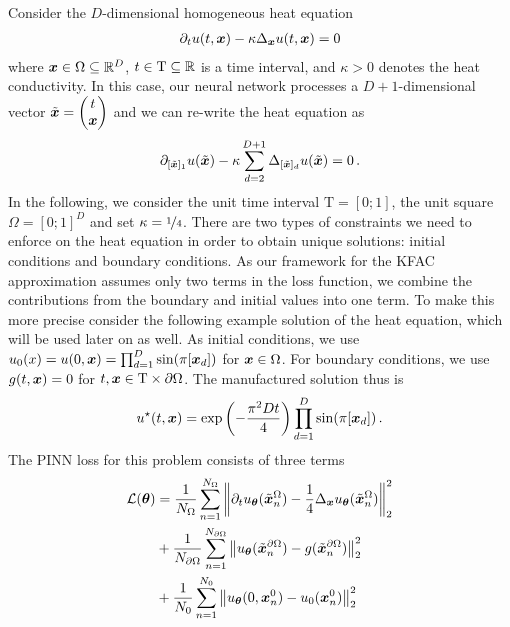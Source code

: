 Consider the $D$-dimensional homogeneous heat equation
\begin{align*}
  \partial_{t} u(t, {\bm{x}})
  -
  \kappa \Delta_{{\bm{x}}} u(t, {\bm{x}})
  =
  0
\end{align*}
where ${\bm{x}} \in \Omega \subseteq {\mathbb{R}}^D$, $t \in \mathrm{T} \subseteq {\mathbb{R}}$ is a time interval, and $\kappa >0$ denotes the heat conductivity. In this case, our neural network processes a $D+1$-dimensional vector $\tilde{{\bm{x}}} =
\begin{pmatrix} t \\ {\bm{x}} \end{pmatrix}$ and we can re-write the heat equation as
\begin{align*}
  \partial_{[\tilde{{\bm{x}}}]_1} u(\tilde{{\bm{x}}})
  -
  \kappa \sum_{d=2}^{D+1} \Delta_{[\tilde{{\bm{x}}}]_d} u(\tilde{{\bm{x}}})
  =
  0\,.
\end{align*}
In the following, we consider the unit time interval $\mathrm{T} = [0;1]$, the unit square $\Omega = [0;1]^D$ and set $\kappa = \nicefrac{1}{4}$. There are two types of constraints we need to enforce on the heat equation in order to obtain unique solutions: initial conditions and boundary conditions. As our framework for the KFAC approximation assumes only two terms in the loss function, we combine the contributions from the boundary and initial values into one term. To make this more precise consider the following example solution of the heat equation, which will be used later on as well.
As initial conditions, we use $u_0(x) = u(0, {\bm{x}}) = \prod_{d=1}^D \sin(\pi [{\bm{x}}_d])$ for ${\bm{x}} \in \Omega$.
For boundary conditions, we use $g(t, {\bm{x}}) = 0$ for $t, {\bm{x}} \in \mathrm{T} \times \partial\Omega$.
The manufactured solution thus is
\begin{align*}
  u^{\star}(t, {\bm{x}})
  =
  \exp \left(-\frac{\pi^2 D t}{4} \right)
  \prod_{d=1}^D \sin(\pi [{\bm{x}}_d])\,.
\end{align*}
The PINN loss for this problem consists of three terms
\begin{align*}
  {\mathcal{L}}({\bm{\theta}})
  &=
    \frac{1}{N_{\Omega}}
    \sum_{n=1}^{N_{\Omega}}
    \left\lVert
    \partial_t u_{{\bm{\theta}}}(\tilde{{\bm{x}}}_n^{\Omega})
    -
    \frac{1}{4} \Delta_{{\bm{x}}} u_{{\bm{\theta}}}(\tilde{{\bm{x}}}_n^{\Omega})
    \right\rVert^2_2
  \\
  &+
    \frac{1}{N_{\partial\Omega}}
    \sum_{n=1}^{N_{\partial\Omega}}
    \left\lVert
    u_{{\bm{\theta}}}(\tilde{{\bm{x}}}_n^{\partial\Omega})
    -
    g(\tilde{{\bm{x}}}_n^{\partial\Omega})
    \right\rVert^2_2
  \\
  &+
    \frac{1}{N_0}
    \sum_{n=1}^{N_0}
    \left\lVert
    u_{{\bm{\theta}}}(0, {\bm{x}}_n^0)
    -
    u_0( {\bm{x}}_n^0)
    \right\rVert^2_2
\end{align*}

